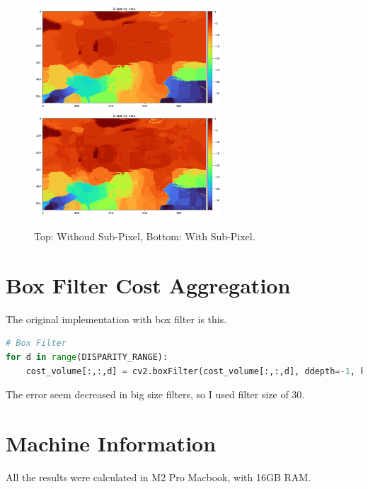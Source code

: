 \begin{figure}[h]
    \centering
    \includegraphics[width=7cm]{../result/disparity_map_nocorrection.png}
    \includegraphics[width=7cm]{../result/disparity_map_correction.png}
    \caption{Top: Withoud Sub-Pixel, Bottom: With Sub-Pixel.}
    \label{fig:result4}
    
\end{figure}
\section*{Box Filter Cost Aggregation}
The original implementation with box filter is this.
\begin{lstlisting}[language=python]
# Box Filter
for d in range(DISPARITY_RANGE):
    cost_volume[:,:,d] = cv2.boxFilter(cost_volume[:,:,d], ddepth=-1, ksize=(30, 30))
\end{lstlisting}
The error seem decreased in big size filters, so I used filter size of 30.
\section*{Machine Information}
All the results were calculated in M2 Pro Macbook, with 16GB RAM.
